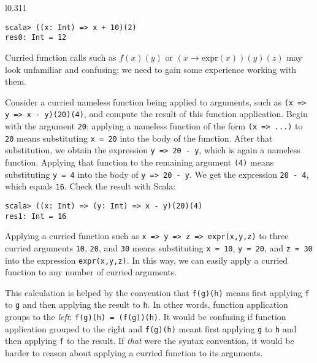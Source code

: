 \begin{wrapfigure}{l}{0.311\columnwidth}%
\vspace{-0.8\baselineskip}
\begin{lstlisting}
scala> ((x: Int) => x + 10)(2)
res0: Int = 12 
\end{lstlisting}

\vspace{-1.3\baselineskip}
\end{wrapfigure}%

\noindent Curried function calls such as $f(x)(y)$ or $\left(x\rightarrow\text{expr}(x)\right)(y)(z)$
may look unfamiliar and confusing; we need to gain some experience
working with them.

Consider a curried nameless function being applied to arguments, such
as \lstinline!(x => y => x - y)(20)(4)!, and compute the result of
this function application. Begin with the argument \lstinline!20!;
applying a nameless function of the form \lstinline!(x => ...)! to
\lstinline!20! means substituting \lstinline!x = 20! into the body
of the function. After that substitution, we obtain the expression
\lstinline!y => 20 - y!, which is again a nameless function. Applying
that function to the remaining argument \lstinline!(4)! means substituting
\lstinline!y = 4! into the body of \lstinline!y => 20 - y!. We get
the expression \lstinline!20 - 4!, which equals \lstinline!16!.
Check the result with Scala:
\begin{lstlisting}
scala> ((x: Int) => (y: Int) => x - y)(20)(4)
res1: Int = 16
\end{lstlisting}

Applying a curried function such as \lstinline!x => y => z => expr(x,y,z)!
to three curried arguments \lstinline!10!, \lstinline!20!, and \lstinline!30!
means substituting \lstinline!x = 10!, \lstinline!y = 20!, and \lstinline!z = 30!
into the expression \lstinline!expr(x,y,z)!. In this way, we can
easily apply a curried function to any number of curried arguments.

This calculation is helped by the convention that \lstinline!f(g)(h)!
means first applying \lstinline!f! to \lstinline!g! and then applying
the result to \lstinline!h!. In other words, function application
groups to the \emph{left}: \lstinline!f(g)(h) = (f(g))(h)!. It would
be confusing if function application grouped to the right and \lstinline!f(g)(h)!
meant first applying \lstinline!g! to \lstinline!h! and then applying
\lstinline!f! to the result. If \emph{that} were the syntax convention,
it would be harder to reason about applying a curried function to
its arguments.

